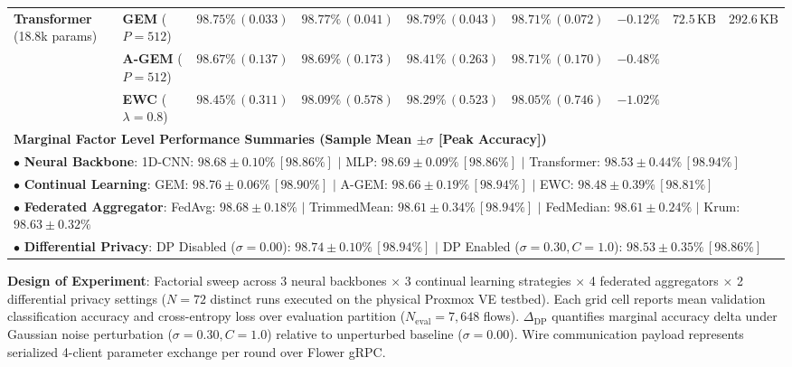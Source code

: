 \documentclass[journal,10pt,twocolumn]{IEEEtran}
\begin{document}
\begin{table}[t]
{\begin{tabular}{llccccccc}
\midrule
\multirow{3}{*}{\textbf{Transformer} (18.8k params)} 
 & \textbf{GEM} ($P{=}512$) & $98.75\%\,(0.033)$ & $98.77\%\,(0.041)$ & $\mathbf{98.79\%\,(0.043)}$ & $98.71\%\,(0.072)$ & $-0.12\%$ & \multirow{3}{*}{$72.5\,\text{KB}$} & \multirow{3}{*}{$292.6\,\text{KB}$} \\
 & \textbf{A-GEM} ($P{=}512$) & $98.67\%\,(0.137)$ & $\mathbf{98.69\%\,(0.173)}$ & $98.41\%\,(0.263)$ & $98.71\%\,(0.170)$ & $-0.48\%$ & & \\
 & \textbf{EWC} ($\lambda{=}0.8$) & $98.45\%\,(0.311)$ & $98.09\%\,(0.578)$ & $98.29\%\,(0.523)$ & $98.05\%\,(0.746)$ & $-1.02\%$ & & \\
\midrule
\multicolumn{9}{l}{\textbf{Marginal Factor Level Performance Summaries (Sample Mean $\pm \sigma$ [Peak Accuracy])}} \\
\multicolumn{9}{l}{\quad $\bullet$ \textbf{Neural Backbone}: 1D-CNN: $98.68 \pm 0.10\%\,[98.86\%]$ \quad $\mid$ \quad MLP: $\mathbf{98.69 \pm 0.09\%\,[98.86\%]}$ \quad $\mid$ \quad Transformer: $98.53 \pm 0.44\%\,[\mathbf{98.94\%}]$} \\
\multicolumn{9}{l}{\quad $\bullet$ \textbf{Continual Learning}: GEM: $\mathbf{98.76 \pm 0.06\%\,[98.90\%]}$ \quad $\mid$ \quad A-GEM: $98.66 \pm 0.19\%\,[\mathbf{98.94\%}]$ \quad $\mid$ \quad EWC: $98.48 \pm 0.39\%\,[98.81\%]$} \\
\multicolumn{9}{l}{\quad $\bullet$ \textbf{Federated Aggregator}: FedAvg: $\mathbf{98.68 \pm 0.18\%}$ \quad $\mid$ \quad TrimmedMean: $98.61 \pm 0.34\%\,[\mathbf{98.94\%}]$ \quad $\mid$ \quad FedMedian: $98.61 \pm 0.24\%$ \quad $\mid$ \quad Krum: $98.63 \pm 0.32\%$} \\
\multicolumn{9}{l}{\quad $\bullet$ \textbf{Differential Privacy}: DP Disabled ($\sigma{=}0.00$): $\mathbf{98.74 \pm 0.10\%\,[98.94\%]}$ \quad $\mid$ \quad DP Enabled ($\sigma{=}0.30, C{=}1.0$): $98.53 \pm 0.35\%\,[98.86\%]$} \\
\bottomrule
\end{tabular}%
}
\vspace{1pt}
\begin{flushleft}
\scriptsize \textbf{Design of Experiment}: Factorial sweep across 3 neural backbones $\times$ 3 continual learning strategies $\times$ 4 federated aggregators $\times$ 2 differential privacy settings ($N=72$ distinct runs executed on the physical Proxmox VE testbed). Each grid cell reports mean validation classification accuracy and cross-entropy loss over evaluation partition ($N_{\text{eval}} = 7{,}648$ flows). $\Delta_{\text{DP}}$ quantifies marginal accuracy delta under Gaussian noise perturbation ($\sigma=0.30, C=1.0$) relative to unperturbed baseline ($\sigma=0.00$). Wire communication payload represents serialized 4-client parameter exchange per round over Flower gRPC.
\end{flushleft}
\end{table}
\end{document}
